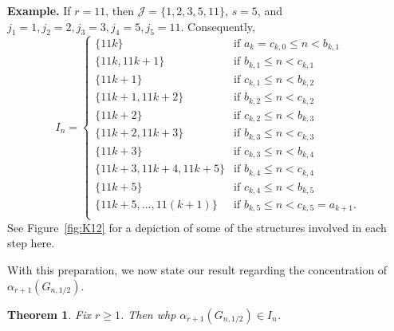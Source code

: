 \documentclass[11pt]{article}
\newtheorem{theorem}{Theorem}
\theoremstyle{definition}
\theoremstyle{remark}
\newcommand{\cJ}{\mathcal{J}}
\begin{document}
{\bf Example.} If $r=11$, then $\cJ=\{1,2,3,5,11\}$,  $s=5$,  and $j_1=1, j_2=2, j_3=3, j_4=5, j_5=11$. Consequently, 
\[ I_n = \begin{cases}   
    \{ 11k\} & \text{if } a_k = c_{k,0} \le n < b_{k,1} \\
 \{ 11k, 11k+1\} & \text{if } b_{k,1} \le n < c_{k,1} \\
 \{11k+1\} & \text{if } c_{k,1} \le n < b_{k,2} \\
\{ 11k+1, 11k+2\} & \text{if } b_{k,2} \le n < c_{k,2} \\

\{11k+2\} & \text{if } c_{k,2} \le n < b_{k,3} \\

\{ 11k+2, 11k+3\} & \text{if } b_{k,3} \le n < c_{k,3} \\

\{11k+3\} & \text{if } c_{k,3} \le n < b_{k,4} \\

\{ 11k+3, 11k+4, 11k+5\} & \text{if } b_{k,4} \le n < c_{k,4} \\

\{11k+5\} & \text{if } c_{k,4} \le n < b_{k,5} \\

\{11k+5, \ldots, 11(k+1)\} & \text{if } b_{k,5} \le n < c_{k,5}= a_{k+1}. \\
    \end{cases}\]
See Figure~\ref{fig:K12} for a depiction of some of the 
structures involved in each step here. 

    
    
    
    

With this preparation, we now state our result regarding the concentration of $ \alpha_{r+1}( G_{n,1/2})$.

\begin{theorem} \label{thm:clique}
Fix $r \ge 1$. Then whp $\alpha_{r+1}(G_{n, 1/2}) \in I_n$.
\end{theorem}
\end{document}

